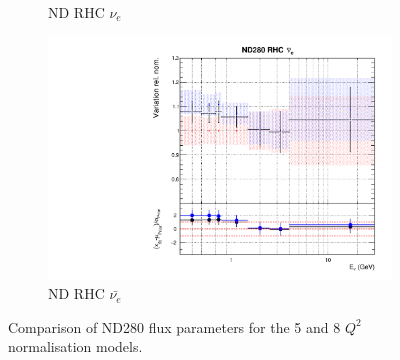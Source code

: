 \begin{figure}
\begin{subfigure}{0.45\textwidth}
  \caption{ND RHC $\nu_{e}$}
\end{subfigure}
\begin{subfigure}{0.45\textwidth}
  \centering
  \includegraphics[width=0.75\linewidth]{figs/comp5q2vs8q2flux7}
  \caption{ND RHC $\bar{\nu_e}$}
\end{subfigure}
\caption{Comparison of ND280 flux parameters for the 5 and 8 $Q^2$ normalisation models.}
\label{fig:comp5q2vs8q2fluxND}
\end{figure}

